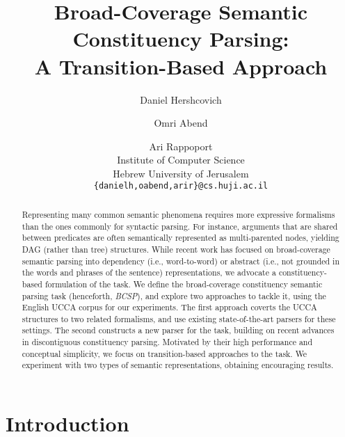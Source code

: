 \documentclass[11pt]{article}
\title{Broad-Coverage Semantic Constituency Parsing: \\
A Transition-Based Approach}
\author{Daniel Hershcovich \and Omri Abend \and Ari Rappoport \\
  Institute of Computer Science \\
  Hebrew University of Jerusalem \\
  {\tt \{danielh,oabend,arir\}@cs.huji.ac.il}
}
\date{}
\begin{document}
\maketitle

\begin{abstract}

  Representing many common semantic phenomena requires more expressive formalisms
  than the ones commonly for syntactic parsing. For instance, arguments that are shared
  between predicates are often semantically represented as multi-parented nodes,
  yielding DAG (rather than tree) structures.
  While recent work has focused on broad-coverage semantic parsing into dependency
  (i.e., word-to-word) or abstract (i.e., not grounded in the words and phrases of the
  sentence) representations, we advocate a constituency-based formulation of the task.
  We define the broad-coverage constituency semantic parsing task (henceforth, {\it BCSP}), and explore
  two approaches to tackle it, using the English UCCA corpus for our experiments.
  The first approach coverts the UCCA structures to two related formalisms, and use existing
  state-of-the-art parsers for these settings. The second constructs a new parser for the task,
  building on recent advances in discontiguous constituency parsing. Motivated by their high
  performance and conceptual simplicity, we focus on transition-based approaches to the task.
  We experiment with two types of semantic representations, obtaining encouraging results.
  
  
\end{abstract}



\section{Introduction}
\end{document}
